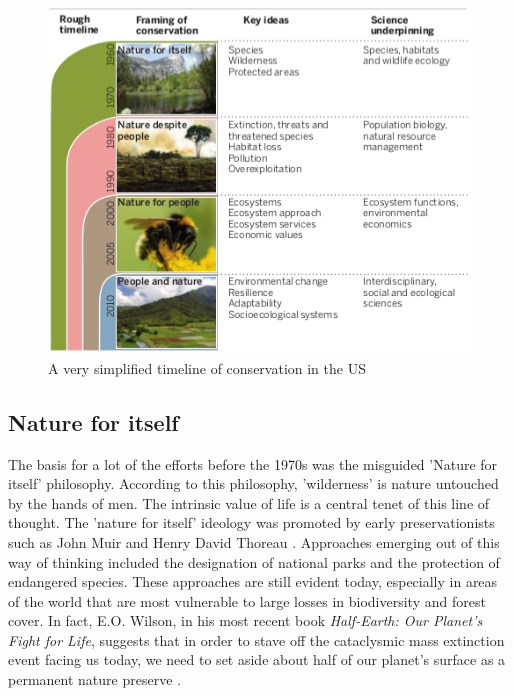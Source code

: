 \documentclass[rutwik_proposal.tex]{subfiles}
\begin{document}
\begin{figure}[h]
\centering
\includegraphics{Images/constimeline}
\caption{A very simplified timeline of conservation in the US\cite{Mace14}}
\label{fig:cons_timeline}
\end{figure}

\subsection{Nature for itself}\label{subsec:intrinsicvals}
The basis for a lot of the efforts before the 1970s was the misguided 'Nature for itself' philosophy. According to this philosophy, 'wilderness' is nature untouched by the hands of men. The intrinsic value of life is a central tenet of this line of thought. The 'nature for itself' ideology was promoted by early preservationists such as John Muir and Henry David Thoreau \cite{Muir1901, Thoreau06}. Approaches emerging out of this way of thinking included the designation of national parks and the protection of endangered species. These approaches are still evident today, especially in areas of the world that are most vulnerable to large losses in biodiversity and forest cover. In fact, E.O. Wilson, in his most recent book \textit{Half-Earth: Our Planet's Fight for Life}, suggests that in order to stave off the cataclysmic mass extinction event facing us today, we need to set aside about half of our planet's surface as a permanent nature preserve \cite{Wilson16}.
\end{document}
